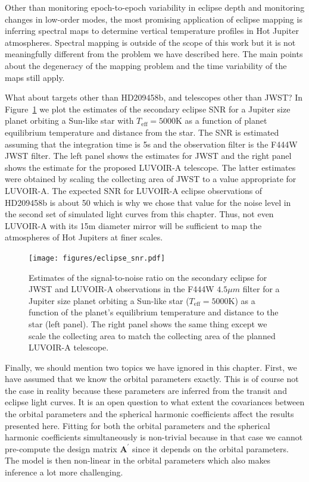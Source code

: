 \documentclass[12pt,dvipsnames]{report}
\renewcommand{\vec}[1]{\boldsymbol{\mathbf{#1}}}
\begin{document}
Other than monitoring epoch-to-epoch variability in eclipse depth and monitoring changes in low-order 
modes, the most promising application of eclipse mapping is inferring spectral maps to determine 
vertical temperature profiles in Hot Jupiter atmospheres. Spectral mapping is outside of the 
scope of this work but it is not meaningfully different from the problem we have described here. 
The main points about the degeneracy of the mapping problem and the time variability of the maps 
still apply. 

What about targets other than HD209458b, and telescopes other than JWST? In 
Figure~\ref{fig:eclipse_snr} we plot the estimates of the secondary eclipse SNR  for a Jupiter
size planet orbiting a Sun-like star with $T_\mathrm{eff}=5000$K as a function of planet equilibrium 
temperature and distance from the star. The SNR is estimated assuming that the integration 
time is 5s and the observation filter is the F444W JWST filter.
 The left panel shows the estimates for JWST and the right panel shows 
the estimate for the proposed LUVOIR-A telescope. 
The latter estimates were obtained by scaling the collecting area of JWST 
to a value appropriate for LUVOIR-A. The expected SNR for LUVOIR-A eclipse observations of 
HD209458b is about 50 which is why we chose that value for the noise level in the second set of
simulated light curves from this chapter. 
Thus, not even LUVOIR-A with its 15m diameter mirror will be sufficient
to map the atmospheres of Hot Jupiters at finer scales.

\begin{figure}[t!]
    \begin{centering}
        \texttt{[image: figures/eclipse\_snr.pdf]}
        \caption{
            Estimates of the signal-to-noise ratio on the secondary eclipse for JWST and LUVOIR-A
            observations in the F444W $4.5\mu m$ filter for a Jupiter size planet
            orbiting a Sun-like star ($T_\mathrm{eff}=5000$K) as
            a function of the planet's equilibrium temperature and distance to the star (left panel).
            The right panel shows the same thing except we scale the collecting area to match 
            the collecting area of the planned LUVOIR-A telescope.
        }
        \label{fig:eclipse_snr}
    \end{centering}
\end{figure}

Finally, we should mention two topics we have ignored in this chapter. 
First, we have assumed that we 
know the orbital parameters exactly. This is of course not the case in reality because these 
parameters are inferred from the transit and eclipse light curves. It is an open question to what 
extent the covariances between the orbital parameters and the spherical harmonic coefficients
affect the results presented here. Fitting for both the orbital parameters and the spherical
harmonic coefficients simultaneously is non-trivial because in that case we cannot
pre-compute the design matrix $\vec A^\prime$ since it depends on the orbital parameters.
The model is then non-linear in the orbital parameters which also makes inference a lot more 
challenging. 
\end{document}
